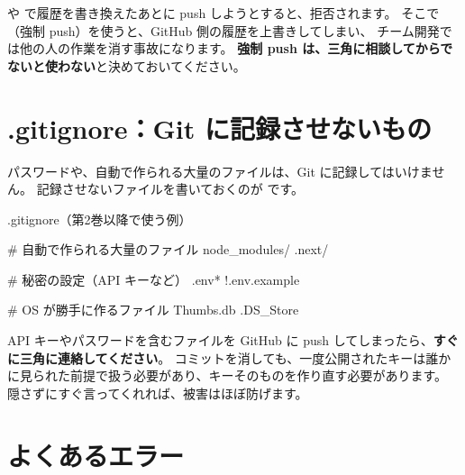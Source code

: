 \begin{caution}
 や  で履歴を書き換えたあとに push しようとすると、拒否されます。
そこで （強制 push）を使うと、GitHub 側の履歴を上書きしてしまい、
チーム開発では他の人の作業を消す事故になります。
\textbf{強制 push は、三角に相談してからでないと使わない}と決めておいてください。
\end{caution}

\section{.gitignore：Git に記録させないもの}

パスワードや、自動で作られる大量のファイルは、Git に記録してはいけません。
記録させないファイルを書いておくのが  です。

\begin{filebox}{.gitignore（第2巻以降で使う例）}
\begin{Piton}[language=code]
# 自動で作られる大量のファイル
node_modules/
.next/

# 秘密の設定（API キーなど）
.env*
!.env.example

# OS が勝手に作るファイル
Thumbs.db
.DS_Store
\end{Piton}
\end{filebox}

\begin{caution}
API キーやパスワードを含むファイルを GitHub に push してしまったら、\textbf{すぐに三角に連絡してください}。
コミットを消しても、一度公開されたキーは誰かに見られた前提で扱う必要があり、キーそのものを作り直す必要があります。
隠さずにすぐ言ってくれれば、被害はほぼ防げます。
\end{caution}

\section{よくあるエラー}

